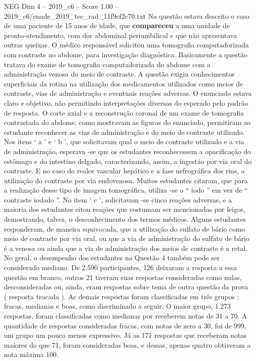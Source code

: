 \begin{textsample}{NEG Dim 4 – 2019\_c6 – Score 1.00 – 2019\_c6/enade\_2019\_tec\_rad\_11f9cf2c70.txt}
Na questão estava descrito o caso de uma paciente de 15 anos de idade, que \textbf{compareceu} a uma unidade de pronto-atendimento, com dor abdominal periumbilical e que não apresentava outras queixas.
O médico responsável solicitou uma tomografia computadorizada com contraste no abdome, para investigação diagnóstica.
Basicamente a questão tratava do exame de tomografia computadorizada do abdome com a administração venosa do meio de contraste.
A questão exigiu conhecimentos superficiais da rotina na utilização dos medicamentos utilizados como meios de contraste, vias de administração e eventuais reações adversas.
O enunciado estava claro e objetivo, não permitindo interpretações diversas do esperado pelo padrão de resposta.
O corte axial e a reconstrução coronal de um exame de tomografia contrastada do abdome, como mostravam as figuras do enunciado, permitiram ao estudante reconhecer as vias de administração e do meio de contraste utilizado.
Nos itens ‘ a ’ e ‘ b ’, que solicitavam qual o meio de contraste utilizado e a via de administração, esperava -se que os estudantes reconhecessem a opacificação do estômago e do intestino delgado, caracterizando, assim, a ingestão por via oral do contraste.
E no caso do realce vascular hepático e a fase nefrográfica dos rins, a utilização do contraste por via endovenosa.
Muitos estudantes citaram, que para a realização desse tipo de imagem tomográfica, utiliza -se o “ iodo ” em vez de “ contraste iodado ”.
No item ‘ c ’, solicitavam -se cinco reações adversas, e a maioria dos estudantes citou reações que costumam ser mencionadas por leigos, demostrando, talvez, o desconhecimento dos termos médicos.
Alguns estudantes responderam, de maneira equivocada, que a utilização do sulfato de bário como meio de contraste por via oral, ou que a via de administração do sulfato de bário é a venosa ou ainda que a via de administração dos meios de contraste é a retal.
No geral, o desempenho dos estudantes na Questão 4 também pode ser considerado mediano.
De 2.590 participantes, 126 deixaram a resposta a essa questão em branco, outros 21 tiveram suas respostas consideradas como nulas, desconsideradas ou, ainda, eram respostas sobre tema de outra questão da prova ( resposta trocada ).
As demais respostas foram classificadas em três grupos : fracas, medianas e boas, como discriminado a seguir.
O maior grupo, 1.273 respostas, foram classificadas como medianas por receberem notas de 31 a 70.
A quantidade de respostas consideradas fracas, com notas de zero a 30, foi de 999, um grupo um pouco menos expressivo.
Já as 171 respostas que receberam notas maiores do que 71, foram consideradas boas, e dessas, apenas quatro obtiveram a nota máxima 100.

\end{textsample}
